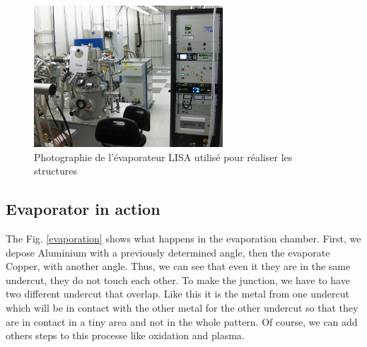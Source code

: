             \begin{figure}[H]
                \centering
                \includegraphics[width=200pt]{LISA.JPG}
                \caption{Photographie de l'évaporateur LISA utilisé pour réaliser les structures}
            \end{figure}
            
            
            \subsection{Evaporator in action}
            
                \label{evapangles}
                The Fig. \ref{evaporation} shows what happens in the evaporation chamber. First, we depose Aluminium with a previously determined angle, then the evaporate Copper, with another angle. Thus, we can see that even it they are in the same undercut, they do not touch each other. To make the junction, we have to have two different undercut that overlap. Like this it is the metal from one undercut which will be in contact with the other metal for the other undercut so that they are in contact in a tiny area and not in the whole pattern. Of course, we can add others steps to this processe like oxidation and plasma.
                
